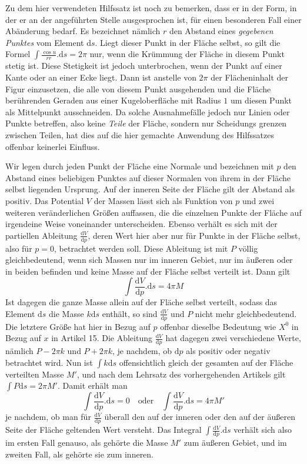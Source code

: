 Zu dem hier verwendeten Hilfssatz ist noch zu bemerken, dass er in der Form, in der er an der angeführten Stelle ausgesprochen ist, für einen besonderen Fall einer Abänderung bedarf. Es bezeichnet nämlich $r$ den Abstand eines \textit{gegebenen Punktes} vom Element $\mathrm ds$. Liegt dieser Punkt in der Fläche selbst, so gilt die Formel $\int\frac{\cos u}{rr}.\mathrm ds=2\pi$ nur, wenn die Krümmung der Fläche in diesem Punkt stetig ist. Diese Stetigkeit ist jedoch unterbrochen, wenn der Punkt auf einer Kante oder an einer Ecke liegt. Dann ist anstelle von $2\pi$ der Flächeninhalt der Figur einzusetzen, die alle von diesem Punkt ausgehenden und die Fläche berührenden Geraden aus einer Kugeloberfläche mit Radius $1$ um diesen Punkt als Mittelpunkt ausschneiden. Da solche Ausnahmefälle jedoch nur Linien oder Punkte betreffen, also keine \textit{Teile} der Fläche, sondern nur Scheidungs%
%
grenzen zwischen Teilen, hat dies auf die hier gemachte Anwendung des Hilfssatzes offenbar keinerlei Einfluss.

Wir legen durch jeden Punkt der Fläche eine Normale und bezeichnen mit $p$ den Abstand eines beliebigen Punktes auf dieser Normalen von ihrem in der Fläche selbst liegenden Ursprung. Auf der inneren Seite der Fläche gilt der Abstand als positiv. Das Potential $V$ der Massen lässt sich als Funktion von $p$ und zwei weiteren veränderlichen Größen auffassen, die die einzelnen Punkte der Fläche auf irgendeine Weise voneinander unterscheiden. Ebenso verhält es sich mit der partiellen Ableitung $\frac{\mathrm dV}{\mathrm dp}$, deren Wert hier aber nur für Punkte in der Fläche selbst, also für $p=0$, betrachtet werden soll. Diese Ableitung ist mit $P$ völlig gleichbedeutend, wenn sich Massen nur im inneren Gebiet, nur im äußeren oder in beiden befinden und keine Masse auf der Fläche selbst verteilt ist. Dann gilt
\[
\int\frac{\mathrm dV}{\mathrm dp}.\mathrm ds=4\pi M
\]
Ist dagegen die ganze Masse allein auf der Fläche selbst verteilt, sodass das Element $\mathrm ds$ die Masse $k\mathrm ds$ enthält, so sind $\frac{\mathrm dV}{\mathrm dp}$ und $P$ nicht mehr gleichbedeutend. Die letztere Größe hat hier in Bezug auf $p$ offenbar dieselbe Bedeutung wie $X^0$ in Bezug auf $x$ in Artikel 15. Die Ableitung $\frac{\mathrm dV}{\mathrm dp}$ hat dagegen zwei verschiedene Werte, nämlich $P-2\pi k$ und $P+2\pi k$, je nachdem, ob $\mathrm dp$ als positiv oder negativ betrachtet wird. Nun ist $\int k\mathrm ds$ offensichtlich gleich der gesamten auf der Fläche verteilten Masse $M'$, und nach dem Lehrsatz des vorhergehenden Artikels gilt $\int P\mathrm ds=2\pi M'$. Damit erhält man
\[
\int\frac{\mathrm dV}{\mathrm dp}.\mathrm ds=0\quad\text{oder}\quad\int\frac{\mathrm dV}{\mathrm dp}.\mathrm ds=4\pi M'
\]
je nachdem, ob man für $\frac{\mathrm dV}{\mathrm dp}$ überall den auf der inneren oder den auf der äußeren Seite der Fläche geltenden Wert versteht. Das Integral $\int\frac{\mathrm dV}{\mathrm dp}.\mathrm ds$ verhält sich also im ersten Fall genauso, als gehörte die Masse $M'$ zum äußeren Gebiet, und im zweiten Fall, als gehörte sie zum inneren.

